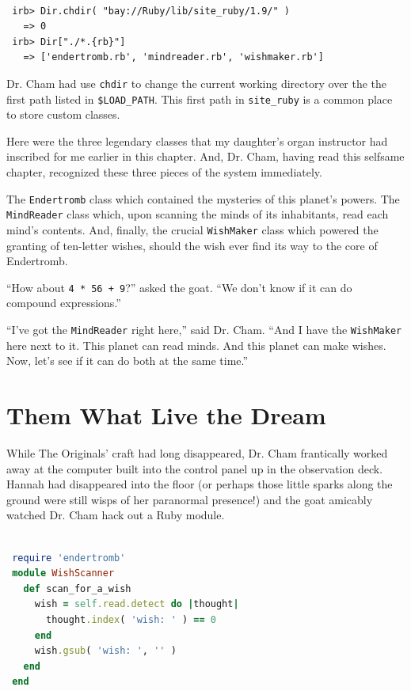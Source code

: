 \documentclass[10pt,twoside]{report}
\begin{document}
\begin{lstlisting}

 irb> Dir.chdir( "bay://Ruby/lib/site_ruby/1.9/" )
   => 0
 irb> Dir["./*.{rb}"]
   => ['endertromb.rb', 'mindreader.rb', 'wishmaker.rb']

\end{lstlisting}


Dr. Cham had use \lstinline[breaklines=true]|chdir| to change the
current working directory over the the first path listed in
\lstinline[breaklines=true]|$LOAD_PATH|.  This first path in
\lstinline[breaklines=true]|site_ruby| is a common place to store
custom classes.

Here were the three legendary classes that my daughter's organ
instructor had inscribed for me earlier in this chapter.  And,
Dr. Cham, having read this selfsame chapter, recognized these three
pieces of the system immediately.

The \lstinline[breaklines=true]|Endertromb| class which contained the
mysteries of this planet's powers.  The
\lstinline[breaklines=true]|MindReader| class which, upon scanning the
minds of its inhabitants, read each mind's contents.  And, finally,
the crucial \lstinline[breaklines=true]|WishMaker| class which powered
the granting of ten-letter wishes, should the wish ever find its way
to the core of Endertromb.

``How about \lstinline[breaklines=true]|4 * 56 + 9|?'' asked the goat.
``We don't know if it can do compound expressions.''

``I've got the \lstinline[breaklines=true]|MindReader| right here,''
said Dr. Cham.  ``And I have the
\lstinline[breaklines=true]|WishMaker| here next to it. This planet
can read minds.  And this planet can make wishes.  Now, let's see if
it can do both at the same time.''


\section{Them What Live the Dream}


While The Originals' craft had long disappeared, Dr. Cham frantically
worked away at the computer built into the control panel up in the
observation deck.  Hannah had disappeared into the floor (or perhaps
those little sparks along the ground were still wisps of her
paranormal presence!) and the goat amicably watched Dr. Cham hack out
a Ruby module.


\begin{lstlisting}[basicstyle=\ttfamily\color{basiccolor},
    commentstyle = \ttfamily\color{commentcolor},
    keywordstyle=\ttfamily\color{keywordscolor},
    stringstyle=\color{stringcolor},
    language=Ruby,
    basicstyle=\small\ttfamily,
    showstringspaces=false,
  ]

 require 'endertromb'
 module WishScanner
   def scan_for_a_wish
     wish = self.read.detect do |thought|
       thought.index( 'wish: ' ) == 0
     end
     wish.gsub( 'wish: ', '' )
   end
 end

\end{lstlisting}
\end{document}
